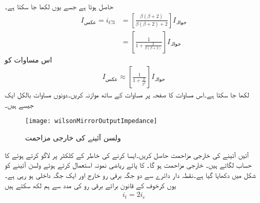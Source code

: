 حاصل ہوتا ہے جسے یوں لکھا جا سکتا ہے۔
\begin{align*}
I_{\textrm{عکس}}=i_{C3}&=\left[\frac{\beta \left(\beta+2 \right)}{\beta \left(\beta+2 \right)+2}\right] I_{\textrm{حوالہ}}\\
&=\left[\frac{1}{1+\frac{2}{\beta \left(\beta+2 \right)}} \right] I_{\textrm{حوالہ}}
\end{align*}
اس مساوات کو 
\begin{align}
I_{\textrm{عکس}} \approx \left[\frac{1}{1+\frac{2}{\beta^2 }} \right] I_{\textrm{حوالہ}}
\end{align}
لکھا جا سکتا ہے۔اس مساوات کا صفحہ  پر مساوات  کے ساتھ موازنہ کریں۔دونوں مساوات بالکل ایک جیسے ہیں۔
\begin{figure}
\centering
\texttt{[image: wilsonMirrorOutputImpedance]}
\caption{ولسن آئینے کی خارجی مزاحمت}
\label{شکل_تفرقی_ولسن_آئینے_کی_خارجی_مزاحمت}
\end{figure}

آئیں آئینے کی خارجی مزاحمت حاصل کریں۔ایسا کرنے کی خاطر  کے کلکٹر پر  لاگو کرتے ہوئے  کا حساب لگاتے ہیں۔ خارجی مزاحمت  ہو گا۔ کا پائے ریاضی نمونہ استعمال کرتے ہوئے ولسن آئینے کو شکل  میں دکھایا گیا ہے۔نقطہ دار دائرے سے  دو جگہ  برقی رو خارج اور ایک جگہ  داخلی ہو رہی ہے۔یوں کرخوف کے قانون برائے برقی رو کی مدد سے ہم لکھ سکتے ہیں
\begin{align}\label{مساوات_تفرقی_ولسن_ٹیست_برقی_رو}
i_t=2 i_c
\end{align}

